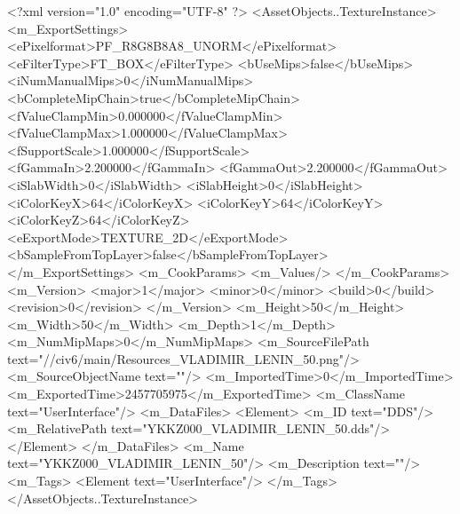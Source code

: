 <?xml version="1.0" encoding="UTF-8" ?>
<AssetObjects..TextureInstance>
	<m_ExportSettings>
		<ePixelformat>PF_R8G8B8A8_UNORM</ePixelformat>
		<eFilterType>FT_BOX</eFilterType>
		<bUseMips>false</bUseMips>
		<iNumManualMips>0</iNumManualMips>
		<bCompleteMipChain>true</bCompleteMipChain>
		<fValueClampMin>0.000000</fValueClampMin>
		<fValueClampMax>1.000000</fValueClampMax>
		<fSupportScale>1.000000</fSupportScale>
		<fGammaIn>2.200000</fGammaIn>
		<fGammaOut>2.200000</fGammaOut>
		<iSlabWidth>0</iSlabWidth>
		<iSlabHeight>0</iSlabHeight>
		<iColorKeyX>64</iColorKeyX>
		<iColorKeyY>64</iColorKeyY>
		<iColorKeyZ>64</iColorKeyZ>
		<eExportMode>TEXTURE_2D</eExportMode>
		<bSampleFromTopLayer>false</bSampleFromTopLayer>
	</m_ExportSettings>
	<m_CookParams>
		<m_Values/>
	</m_CookParams>
	<m_Version>
		<major>1</major>
		<minor>0</minor>
		<build>0</build>
		<revision>0</revision>
	</m_Version>
	<m_Height>50</m_Height>
	<m_Width>50</m_Width>
	<m_Depth>1</m_Depth>
	<m_NumMipMaps>0</m_NumMipMaps>
	<m_SourceFilePath text="//civ6/main/Resources_VLADIMIR_LENIN_50.png"/>
	<m_SourceObjectName text=""/>
	<m_ImportedTime>0</m_ImportedTime>
	<m_ExportedTime>2457705975</m_ExportedTime>
	<m_ClassName text="UserInterface"/>
	<m_DataFiles>
		<Element>
			<m_ID text="DDS"/>
			<m_RelativePath text="YKKZ000_VLADIMIR_LENIN_50.dds"/>
		</Element>
	</m_DataFiles>
	<m_Name text="YKKZ000_VLADIMIR_LENIN_50"/>
	<m_Description text=""/>
	<m_Tags>
		<Element text="UserInterface"/>
	</m_Tags>
</AssetObjects..TextureInstance>

